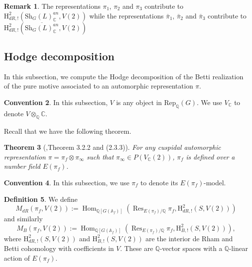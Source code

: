 \documentclass[11pt, a4paper]{amsart}
\theoremstyle{plain}
\newtheorem{theorem}{Theorem}[section]
\theoremstyle{definition}
\newtheorem{definition}[theorem]{Definition}
\newtheorem{remark}[theorem]{Remark}
\newtheorem{convention}[theorem]{Convention}
\numberwithin{equation}{section}
\def\AAA{\mathbb{A}}
\def\CC{\mathbb{C}}
\def\QQ{\mathbb{Q}}
\DeclareMathOperator{\Res}{Res}
\DeclareMathOperator{\Hom}{Hom}
\newcommand{\Sh}{\mathrm{Sh}}
\begin{document}
\begin{remark}
    The representations $\pi_1$, $\pi_2$ and $\pi_3$ contribute to $\mathrm{H}^{2}_{dR, !}(\Sh_{G}(L)_{\CC}^{an}, V(2))$ while the representations $\bar{\pi}_1$, $\bar{\pi}_2$ and $\bar{\pi}_3$ contribute to $\mathrm{H}^{2}_{dR, !}(\overline{\Sh_{G}(L)_{\CC}^{an}}, V(2))$
\end{remark}

\subsection{Hodge decomposition}
\label{SS: Hodge decomposition}
In this subsection, we compute the Hodge decomposition of the Betti realization of the pure motive associated to an automorphic representation $\pi$. 

\begin{convention}
    In this subsection, $V$ is any object in $\mathrm{Rep}_{\QQ}(G)$. We use $V_{\CC}$ to denote $V \otimes_{\QQ} \CC$. 
\end{convention}

Recall that we have the following theorem. 
\begin{theorem}[\cite{BHD94},Theorem 3.2.2 and (2.3.3)]
\label{Thm: rational field}
    For any cuspidal automorphic representation $\pi = \pi_{f} \otimes \pi_{\infty}$ such that $\pi_{\infty} \in P(V_{\CC}(2))$, $\pi_f$ is defined over a number field $E(\pi_f)$. 
\end{theorem}

\begin{convention}
    In this subsection, we use $\pi_{f}$ to denote its $E(\pi_f)$-model. 
\end{convention}

\begin{definition}
\label{def: M_B and M_dR}
We define
\begin{equation*}
    M_{dR}(\pi_{f}, V(2)) := \Hom_{\QQ[G(\AAA_f)]}(\Res_{E(\pi_f)/\QQ}\pi_f, \mathrm{H}_{dR, !}^{2}(S, V(2)))
\end{equation*}
and similarly 
\begin{equation*}
    M_{B}(\pi_{f}, V(2)) := \Hom_{\QQ[G(\AAA_f)]}(\Res_{E(\pi_f)/\QQ}\pi_f, \mathrm{H}_{B, !}^{2}(S, V(2))), 
\end{equation*}
where $\mathrm{H}_{dR, !}^{2}(S, V(2))$ and $\mathrm{H}_{B, !}^{2}(S, V(2))$ are the interior de Rham and Betti cohomology with coefficients in $V$. 
These are $\QQ$-vector spaces with a $\QQ$-linear action of $E(\pi_f)$. 
\end{definition}
\end{document}
